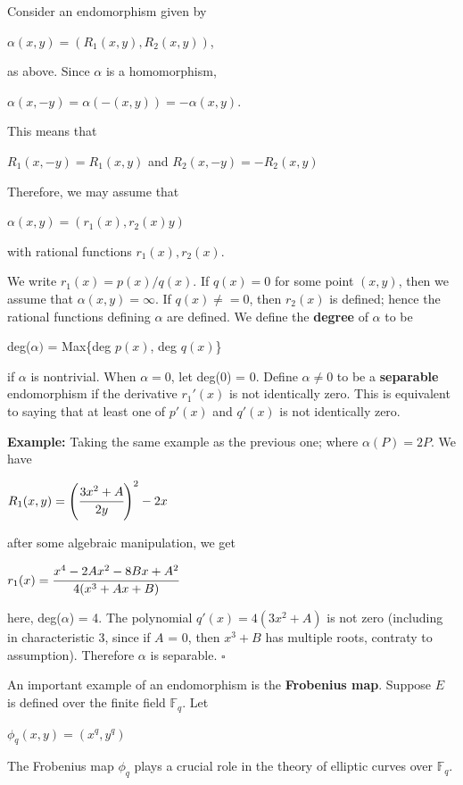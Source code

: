 \documentclass[a4paper, 12pt]{article}
\begin{document}
Consider an endomorphism given by
\begin{center} $\alpha(x,y)=(R_1(x,y),R_2(x,y))$, \end{center}
as above. Since $\alpha$ is a homomorphism,
\begin{center} $\alpha(x,-y)=\alpha(-(x,y))=-\alpha(x,y). $\end{center}
This means that
\begin{center} $R_1(x,-y)=R_1(x,y)$ \quad and \quad $R_2(x,-y)=-R_2(x,y)$ \end{center}
Therefore, we may assume that
\begin{center} $\alpha(x,y)=(r_1(x),r_2(x)y)$ \end{center}
with rational functions $r_1(x), r_2(x)$.\par
We write $r_1(x)=p(x)/q(x)$. If $q(x) = 0$ for some point $(x,y)$, then we assume that $\alpha(x,y) = \infty$. If $q(x)\neq =0$, then $r_2(x)$ is defined; hence the rational functions defining $\alpha$ are defined.\newline
We define the \textbf{degree} of $\alpha$ to be
\begin{center} deg($\alpha)$ = Max\{deg $p(x)$, deg $q(x)$\} \end{center}
if $\alpha$ is nontrivial. When $\alpha = 0$, let deg(0) = 0. Define $\alpha \neq 0$ to be a \textbf{separable} endomorphism if the derivative $r_1'(x)$ is not identically zero. This is equivalent to saying that at least one of $p'(x)$ and $q'(x)$ is not identically zero.\par
\textbf{Example:}\newline
Taking the same example as the previous one; where $\alpha(P)=2P$. We have
\begin{center} $R_1(x,y)=\left(\cfrac{3x^2+A}{2y}\right)^2 - 2x$ \end{center}
after some algebraic manipulation, we get
\begin{center} $r_1(x) = \cfrac{x^4-2Ax^2-8Bx+A^2}{4(x^3+Ax+B)}$ \end{center}
here, deg($\alpha$) = 4. The polynomial $q'(x) = 4(3x^2+A)$ is not zero (including in characteristic 3, since if $A$ = 0, then $x^3+B$ has multiple roots, contraty to assumption). Therefore $\alpha$ is separable. $\square$ \par
An important example of an endomorphism is the \textbf{Frobenius map}.\newline
Suppose $E$ is defined over the finite field $\mathbb{F}_q$. Let
\begin{center} $\phi_q(x, y) = (x^q, y^q)$ \end{center}
The Frobenius map $\phi_q$ plays a crucial role in the theory of elliptic curves over $\mathbb{F}_q$.
\end{document}
